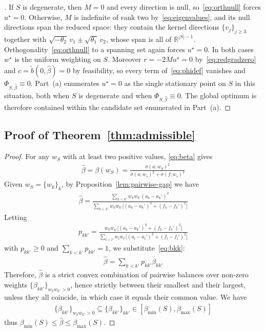 \documentclass[11pt]{article}
\begin{document}
\begin{proof}[]
If $S$ is degenerate, then $M = 0$ and every direction is null, so~\eqref{eq:orthnull} forces $u^\star = 0$. Otherwise, $M$ is indefinite of rank two by~\eqref{eq:eigenvalues}, and its null directions span the reduced space: they contain the kernel directions $\{v_j\}_{j\ge3}$ together with $\sqrt{-\theta_2}\,v_1 \pm \sqrt{\theta_1}\,v_2$, whose span is all of $\mathbb R^{|S|-1}$. Orthogonality~\eqref{eq:orthnull} to a spanning set again forces $u^\star = 0$.
In both cases $w^\star$ is the uniform weighting on $S$. Moreover $r = -2Mu^\star = 0$ by~\eqref{eq:redgradzero} and $c = \tilde b(0,\hat\beta) = 0$ by feasibility, so every term of~\eqref{eq:phidef} vanishes and $\Phi_{S,\hat\beta} \equiv 0$. Part~(a) enumerates $u^\star = 0$ as the single stationary point on $S$ in this situation, both when $S$ is degenerate and when $\Phi_{S,\hat\beta} \equiv 0$.
The global optimum is therefore contained within the candidate set enumerated in Part~(a).
\end{proof}

\subsection{Proof of Theorem~\ref{thm:admissible}}
\label{app:proof-admissible}

\theoremadmissible*

\begin{proof}
For any $w_S$ with at least two positive values, \eqref{eq:beta} gives
\begin{align}
    \hat\beta = \beta(w_S) = \frac{\sigma(a; w_S)^2}{\sigma(a;w_s)^2+\sigma(f;w_s)^2}
\end{align}
Given $w_S = \{w_k\}_k$, by Proposition~\ref{lem:pairwise-gap} we have
\begin{align}
    \hat\beta = \frac{\sum_{k<k'}w_kw_{k'}(a_k{-}a_k')^2}{\sum_{k<k'} w_kw_{k'}\big[(a_k{-}a_k')^2{+}(f_k{-}f_k')^2 \big]}
\end{align}
Letting
\begin{align}
    p_{kk'}= \frac{w_kw_{k'} \big[ (a_k{-}a_k')^2 + (f_k{-}f_k')^2 \big]}{\sum_{l<l'} w_lw_{l'}\big[ (a_l{-}a_l')^2 + (f_l{-}f_l')^2 \big]}
\end{align}
with $p_{kk'}\ge0$ and $\sum_{k<k'} p_{kk'}=1$, we substitute~\eqref{eq:bkk}:
\begin{align}
    \hat\beta = \sum_{k<k'} p_{kk'} \beta_{kk'}
\end{align}
Therefore, $\hat\beta$ is a strict convex combination of pairwise balances over non-zero weights $\{\beta_{kk'}\}_{w_kw_{k'}>0}$, hence strictly between their smallest and their largest, unless they all coincide, in which case it equals their common value. We have
\begin{align}
    \{\beta_{kk'}\}_{w_kw_{k'}>0} \subseteq \{\beta_{kk'}\}_{kk'} \in [\beta_{\min}(S), \beta_{\max}(S)]
\end{align}
thus $\beta_{\min}(S) \le \hat\beta \le \beta_{\max}(S)$.
\end{proof}
\end{document}
